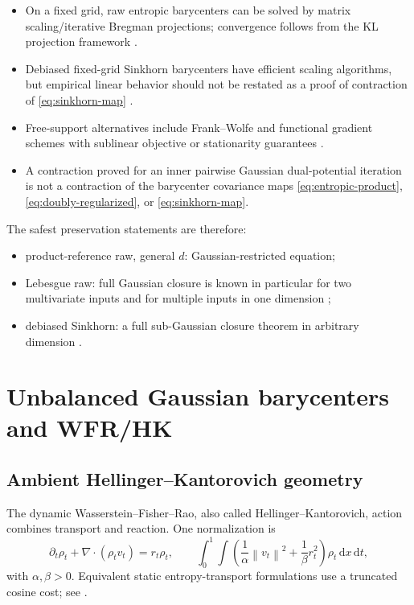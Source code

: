 \documentclass[11pt]{article}
\theoremstyle{definition}
\newcommand{\dd}{\,\mathrm d}
\newcommand{\norm}[1]{\left\lVert #1\right\rVert}
\begin{document}
\begin{itemize}
  \item On a fixed grid, raw entropic barycenters can be solved by matrix
  scaling/iterative Bregman projections; convergence follows from the KL
  projection framework \cite{CuturiDoucet2014,BenamouEtAl2015}.
  \item Debiased fixed-grid Sinkhorn barycenters have efficient scaling
  algorithms, but empirical linear behavior should not be restated as a
  proof of contraction of \eqref{eq:sinkhorn-map}
  \cite{JanatiCuturiGramfort2020}.
  \item Free-support alternatives include Frank--Wolfe and functional
  gradient schemes with sublinear objective or stationarity guarantees
  \cite{LuiseEtAl2019,ShenEtAl2020}.
  \item A contraction proved for an inner pairwise Gaussian dual-potential
  iteration is not a contraction of the barycenter covariance maps
  \eqref{eq:entropic-product}, \eqref{eq:doubly-regularized}, or
  \eqref{eq:sinkhorn-map}.
\end{itemize}

The safest preservation statements are therefore:
\begin{itemize}
  \item product-reference raw, general $d$: Gaussian-restricted equation;
  \item Lebesgue raw: full Gaussian closure is known in particular for two
  multivariate inputs and for multiple inputs in one dimension
  \cite{CumingsMenonShin2020,JanatiCuturiGramfort2020};
  \item debiased Sinkhorn: a full sub-Gaussian closure theorem in arbitrary
  dimension \cite{JanatiEtAl2020UnbalancedGaussian}.
\end{itemize}

\section{Unbalanced Gaussian barycenters and WFR/HK}

\subsection{Ambient Hellinger--Kantorovich geometry}

The dynamic Wasserstein--Fisher--Rao, also called Hellinger--Kantorovich,
action combines transport and reaction.  One normalization is
\begin{equation}\label{eq:wfr-dynamic}
 \partial_t\rho_t+\nabla\!\cdot(\rho_tv_t)=r_t\rho_t,
 \qquad
 \int_0^1\int\left(\frac1\alpha\norm{v_t}^2
 +\frac1\beta r_t^2\right)\rho_t\dd x\dd t,
\end{equation}
with $\alpha,\beta>0$.  Equivalent static entropy-transport formulations use
a truncated cosine cost; see
\cite{LieroMielkeSavare2018,ChizatEtAl2018}.
\end{document}
